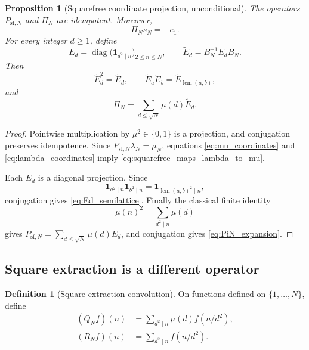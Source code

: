\documentclass[11pt]{amsart}
\numberwithin{equation}{section}
\theoremstyle{plain}
\newtheorem{proposition}[theorem]{Proposition}
\theoremstyle{definition}
\newtheorem{definition}[theorem]{Definition}
\theoremstyle{remark}
\newcommand{\one}{\mathbf 1}
\newcommand{\mob}{\mu}
\newcommand{\liou}{\lambda}
\DeclareMathOperator{\diag}{diag}
\DeclareMathOperator{\lcm}{lcm}
\begin{document}
\begin{proposition}[Squarefree coordinate projection, unconditional]
\label{prop:squarefree_coordinate_projection}
The operators $P_{\mathrm{sf},N}$ and $\Pi_N$ are idempotent.  Moreover,
\begin{equation}
\Pi_Ns_N=-e_1.
\label{eq:squarefree_maps_lambda_to_mu}
\end{equation}
For every integer $d\ge1$, define
\begin{equation}
E_d=\diag\bigl(\one_{d^2\mid n}\bigr)_{2\le n\le N},
\qquad
\widetilde E_d=B_N^{-1}E_dB_N.
\label{eq:Ed_definitions}
\end{equation}
Then
\begin{equation}
\widetilde E_d^2=\widetilde E_d,
\qquad
\widetilde E_a\widetilde E_b=\widetilde E_{\lcm(a,b)},
\label{eq:Ed_semilattice}
\end{equation}
and
\begin{equation}
\Pi_N=\sum_{d\le\sqrt N}\mob(d)\widetilde E_d.
\label{eq:PiN_expansion}
\end{equation}
\end{proposition}

\begin{proof}
Pointwise multiplication by $\mob^2\in\{0,1\}$ is a projection, and conjugation preserves idempotence.  Since $P_{\mathrm{sf},N}\liou_N=\mob_N$, equations \eqref{eq:mu_coordinates} and \eqref{eq:lambda_coordinates} imply \eqref{eq:squarefree_maps_lambda_to_mu}.

Each $E_d$ is a diagonal projection.  Since
\begin{equation}
\one_{a^2\mid n}\one_{b^2\mid n}=\one_{\lcm(a,b)^2\mid n},
\label{eq:divisibility_projection_product}
\end{equation}
conjugation gives \eqref{eq:Ed_semilattice}.  Finally the classical finite identity
\begin{equation}
\mob(n)^2=\sum_{d^2\mid n}\mob(d)
\label{eq:mobius_squarefree_identity}
\end{equation}
gives $P_{\mathrm{sf},N}=\sum_{d\le\sqrt N}\mob(d)E_d$, and conjugation gives \eqref{eq:PiN_expansion}.
\end{proof}

\subsection{Square extraction is a different operator}
\label{subsec:square_extraction}

\begin{definition}[Square-extraction convolution]
\label{def:square_extraction}
On functions defined on $\{1,\ldots,N\}$, define
\begin{align}
(Q_Nf)(n)&=\sum_{d^2\mid n}\mob(d)f(n/d^2),
\label{eq:Q_definition}\\
(R_Nf)(n)&=\sum_{d^2\mid n}f(n/d^2).
\label{eq:R_definition}
\end{align}
\end{definition}
\end{document}
